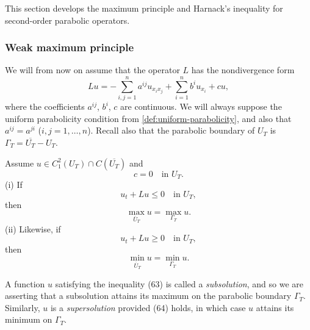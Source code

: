 This section develops the maximum principle and Harnack's inequality for second-order parabolic operators.

\subsubsection{Weak maximum principle}

We will from now on assume that the operator $L$ has the nondivergence form
\[
Lu = -\sum_{i,j=1}^{n} a^{ij}u_{x_i x_j} + \sum_{i=1}^{n} b^i u_{x_i} + cu,
\tag{61}
\]
where the coefficients $a^{ij}$, $b^i$, $c$ are continuous. We will always suppose the uniform parabolicity condition from \cref{def:uniform-parabolicity}, and also that $a^{ij} = a^{ji}$ ($i,j = 1,\ldots,n$). Recall also that the parabolic boundary of $U_T$ is $\Gamma_T = \overline{U_T} - U_T$.

\begin{theorem}
\label{thm:parabolic-weak-maximum-principle}
Assume $u \in C^2_1(U_T) \cap C(\overline{U_T})$ and
\[
c = 0 \quad \text{in } U_T.
\tag{62}
\]
(i) If
\[
u_t + Lu \leq 0 \quad \text{in } U_T,
\tag{63}
\]
then
\[
\max_{\bar U_T} u = \max_{\Gamma_T} u.
\]
(ii) Likewise, if
\[
u_t + Lu \geq 0 \quad \text{in } U_T,
\tag{64}
\]
then
\[
\min_{\bar U_T} u = \min_{\Gamma_T} u.
\]
\end{theorem}

\begin{remark}
\label{rem:parabolic-subsolution-supersolution}
A function $u$ satisfying the inequality (63) is called a \textit{subsolution}, and so we are asserting that a subsolution attains its maximum on the parabolic boundary $\Gamma_T$. Similarly, $u$ is a \textit{supersolution} provided (64) holds, in which case $u$ attains its minimum on $\Gamma_T$.
\end{remark}

